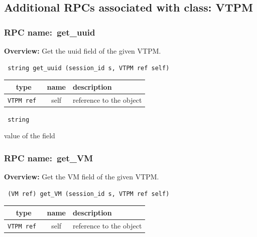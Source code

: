 \subsection{Additional RPCs associated with class: VTPM}
\subsubsection{RPC name:~get\_uuid}

{\bf Overview:} 
Get the uuid field of the given VTPM.

\begin{verbatim} string get_uuid (session_id s, VTPM ref self)\end{verbatim}



 
\vspace{0.3cm}
\begin{tabular}{|c|c|p{7cm}|}
 \hline
{\bf type} & {\bf name} & {\bf description} \\ \hline
{\tt VTPM ref } & self & reference to the object \\ \hline 

\end{tabular}

\vspace{0.3cm}

{\tt 
string
}


value of the field
\vspace{0.3cm}
\vspace{0.3cm}
\vspace{0.3cm}
\subsubsection{RPC name:~get\_VM}

{\bf Overview:} 
Get the VM field of the given VTPM.

\begin{verbatim} (VM ref) get_VM (session_id s, VTPM ref self)\end{verbatim}



 
\vspace{0.3cm}
\begin{tabular}{|c|c|p{7cm}|}
 \hline
{\bf type} & {\bf name} & {\bf description} \\ \hline
{\tt VTPM ref } & self & reference to the object \\ \hline 

\end{tabular}

